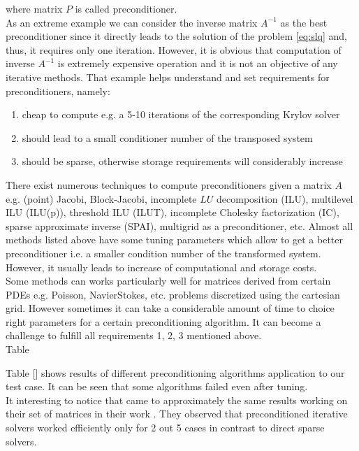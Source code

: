 where matrix $P$ is called preconditioner.\\


As an extreme example we can consider the inverse matrix $A^{-1}$ as the best preconditioner since it directly leads to the solution of the problem \ref{eq:slq} and, thus, it requires only one iteration. However, it is obvious that computation of inverse $A^{-1}$ is extremely expensive operation and it is not an objective of any iterative methods. That example helps understand and set requirements for preconditioners, namely:

\begin{enumerate}
	\item cheap to compute e.g. a 5-10 iterations of the corresponding Krylov solver
	\item should lead to a small conditioner number of the transposed system
	\item should be sparse, otherwise storage requirements will considerably increase
\end{enumerate}


There exist numerous techniques to compute preconditioners given a matrix $A$ e.g. (point) Jacobi, Block-Jacobi, incomplete $LU$ decomposition (ILU), multilevel ILU (ILU(p)), threshold ILU (ILUT), incomplete Cholesky factorization (IC), sparse approximate inverse (SPAI), multigrid as a preconditioner, etc. Almost all methods listed above have some tuning parameters which allow to get a better preconditioner i.e. a smaller condition number of the transformed system. However, it usually leads to increase of computational and storage costs. \\

Some methods can works particularly well for matrices derived from certain PDEs e.g. Poisson, Navier\-Stokes, etc. problems discretized using the cartesian grid. However sometimes it can take a considerable amount of time to choice right parameters for a certain preconditioning algorithm. It can become a challenge to fulfill all requirements 1, 2, 3 mentioned above. \\

Table 

Table [] shows results of different preconditioning algorithms application to our test case. It can be seen that some algorithms failed even after tuning. \\

It interesting to notice that \citeauthor{wsmp} came to approximately the same results working on their set of matrices in their work \cite{wsmp}. They observed that preconditioned iterative solvers worked efficiently only for 2 out 5 cases in contrast to direct sparse solvers.\\

